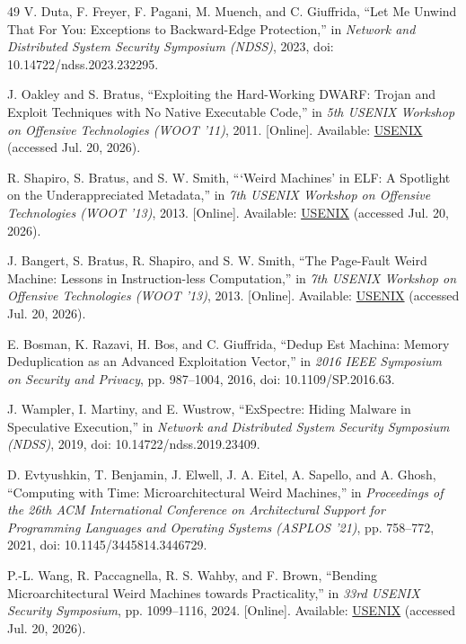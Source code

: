 \documentclass[conference]{IEEEtran}
\begin{document}
\begin{thebibliography}{49}
V. Duta, F. Freyer, F. Pagani, M. Muench, and C. Giuffrida, ``Let Me Unwind That For You: Exceptions to Backward-Edge Protection,'' in \emph{Network and Distributed System Security Symposium (NDSS)}, 2023, doi: 10.14722/ndss.2023.232295.

J. Oakley and S. Bratus, ``Exploiting the Hard-Working DWARF: Trojan and Exploit Techniques with No Native Executable Code,'' in \emph{5th USENIX Workshop on Offensive Technologies (WOOT '11)}, 2011. [Online]. Available: \href{https://www.usenix.org/conference/woot11/exploiting-hard-working-dwarf-trojan-and-exploit-techniques-no-native-executable}{USENIX} (accessed Jul. 20, 2026).

R. Shapiro, S. Bratus, and S. W. Smith, ```Weird Machines' in ELF: A Spotlight on the Underappreciated Metadata,'' in \emph{7th USENIX Workshop on Offensive Technologies (WOOT '13)}, 2013. [Online]. Available: \href{https://www.usenix.org/system/files/conference/woot13/woot13-shapiro.pdf}{USENIX} (accessed Jul. 20, 2026).

J. Bangert, S. Bratus, R. Shapiro, and S. W. Smith, ``The Page-Fault Weird Machine: Lessons in Instruction-less Computation,'' in \emph{7th USENIX Workshop on Offensive Technologies (WOOT '13)}, 2013. [Online]. Available: \href{https://www.usenix.org/conference/woot13/workshop-program/presentation/bangert}{USENIX} (accessed Jul. 20, 2026).

E. Bosman, K. Razavi, H. Bos, and C. Giuffrida, ``Dedup Est Machina: Memory Deduplication as an Advanced Exploitation Vector,'' in \emph{2016 IEEE Symposium on Security and Privacy}, pp. 987--1004, 2016, doi: 10.1109/SP.2016.63.

J. Wampler, I. Martiny, and E. Wustrow, ``ExSpectre: Hiding Malware in Speculative Execution,'' in \emph{Network and Distributed System Security Symposium (NDSS)}, 2019, doi: 10.14722/ndss.2019.23409.

D. Evtyushkin, T. Benjamin, J. Elwell, J. A. Eitel, A. Sapello, and A. Ghosh, ``Computing with Time: Microarchitectural Weird Machines,'' in \emph{Proceedings of the 26th ACM International Conference on Architectural Support for Programming Languages and Operating Systems (ASPLOS '21)}, pp. 758--772, 2021, doi: 10.1145/3445814.3446729.

P.-L. Wang, R. Paccagnella, R. S. Wahby, and F. Brown, ``Bending Microarchitectural Weird Machines towards Practicality,'' in \emph{33rd USENIX Security Symposium}, pp. 1099--1116, 2024. [Online]. Available: \href{https://www.usenix.org/conference/usenixsecurity24/presentation/wang-ping-lun}{USENIX} (accessed Jul. 20, 2026).


\end{thebibliography}
\end{document}
